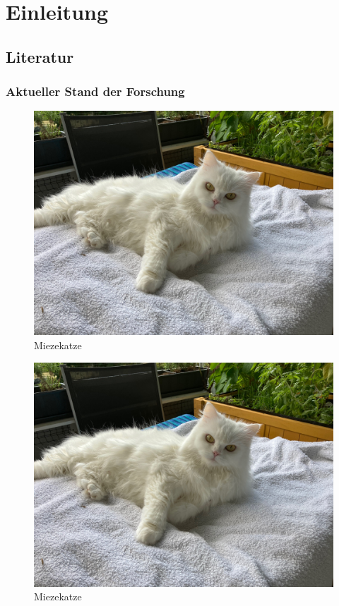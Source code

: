 \documentclass[12pt,ngerman,parskip=half]{scrartcl}
\begin{document}
\section{Einleitung}\label{sec:einleitung}
\subsection{Literatur}\label{ssec:literatur}
\subsubsection{Aktueller Stand der Forschung}

\blindtext \marginpar{\scalebox{3}{\Tribar}}

\begin{figure}[h]
\includegraphics[width=\textwidth]{./Bilder/Katze1}
\caption{Miezekatze}\label{fig:miezekatze}
\end{figure}



\begin{figure}[h]
\includegraphics[width=\textwidth]{./Bilder/Katze1}
\caption{Miezekatze}\label{fig:miezekatze2}
\end{figure}
\end{document}
